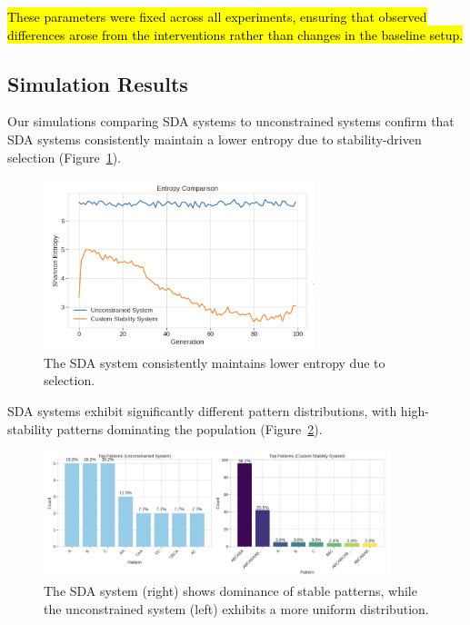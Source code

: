 \documentclass[preprint,12pt]{elsarticle}
\newcommand{\added}[1]{\hl{#1}}
\begin{document}
\added{These parameters were fixed across all experiments, ensuring
that observed differences arose from the interventions rather than changes in
the baseline setup.}


\subsection{Simulation Results}

Our simulations comparing SDA systems to unconstrained systems confirm that SDA systems consistently maintain a lower entropy due to stability-driven selection (Figure~\ref{fig:figure_3}).

\begin{figure}[H]
    \centering
    \includegraphics[width=0.7\textwidth]{figure_3.png}
    \caption{The SDA system consistently maintains lower entropy due to selection.}
    \label{fig:figure_3}
\end{figure}

SDA systems exhibit significantly different pattern distributions, with high-stability patterns dominating the population (Figure~\ref{fig:figure_4}).

\begin{figure}[H]
    \centering
    \includegraphics[width=0.9\textwidth]{figure_4}
    \caption{The SDA system (right) shows dominance of stable patterns, while the unconstrained system (left) exhibits a more uniform distribution.}
    \label{fig:figure_4}
\end{figure}
\end{document}
